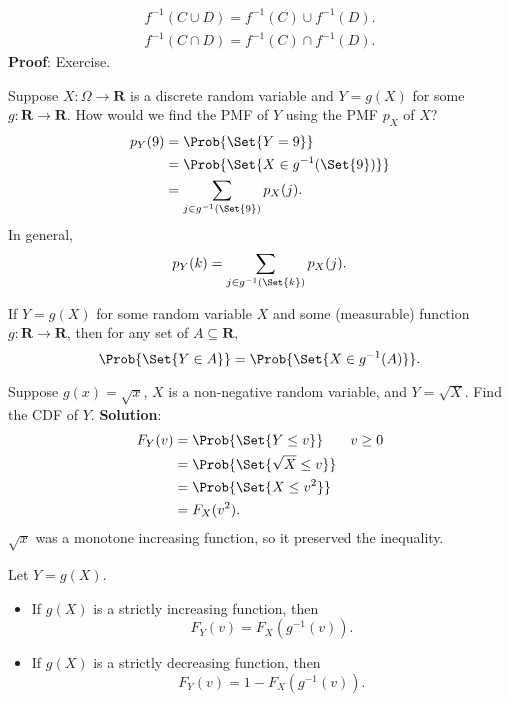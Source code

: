 \begin{Proposition}{}{}
    \begin{align*}
        f^{-1}(C\cup D)=f^{-1}(C)\cup f^{-1}(D). \\
        f^{-1}(C\cap D)=f^{-1}(C)\cap f^{-1}(D).
    \end{align*}
    \tcblower{}
    \textbf{Proof}: Exercise.
\end{Proposition}
Suppose $ X\colon \Omega\to\mathbf{R} $ is a discrete
random variable and $ Y=g(X) $ for some
$ g\colon\mathbf{R}\to\mathbf{R} $.
How would we find the PMF of $ Y $ using the PMF $ p_X $ of $ X $?
\begin{align*}
    p_Y(9)
     & =\Prob{\Set{Y=9}}                   \\
     & =\Prob{\Set{X\in g^{-1}(\Set{9})}}  \\
     & =\sum_{j\in g^{-1}(\Set{9})}p_X(j).
\end{align*}
In general,
\[ p_Y(k)=\sum_{j\in g^{-1}(\Set{k})}p_X(j). \]
\begin{Theorem}{}{}
    If $ Y=g(X) $ for some random variable $ X $
    and some (measurable) function $ g\colon\mathbf{R}\to\mathbf{R} $,
    then for any set of $ A\subseteq \mathbf{R} $,
    \[ \Prob{\Set{Y\in A}}=\Prob{\Set{X\in g^{-1}(A)}}. \]
\end{Theorem}
\begin{Example}{}{}
    Suppose $ g(x)=\sqrt{x} $, $ X $ is a non-negative random variable,
    and $ Y=\sqrt{X} $. Find the CDF of $ Y $.
    \tcblower{}
    \textbf{Solution}:
    \begin{align*}
        F_Y(v)
         & =\Prob{\Set{Y\le v}}        &  & v\ge 0 \\
         & =\Prob{\Set{\sqrt{X}\le v}}             \\
         & =\Prob{\Set{X\le v^2}}                  \\
         & =F_X(v^2).
    \end{align*}
    $ \sqrt{x} $ was a monotone increasing function, so it
    preserved the inequality.
\end{Example}
\begin{Theorem}{}{}
    Let $ Y=g(X) $.
    \begin{itemize}
        \item If $ g(X) $ is a strictly increasing function, then
              \[ F_Y(v)=F_X(g^{-1}(v)). \]
        \item If $ g(X) $ is a strictly decreasing function, then
              \[ F_Y(v)=1-F_X(g^{-1}(v)). \]
    \end{itemize}
\end{Theorem}
